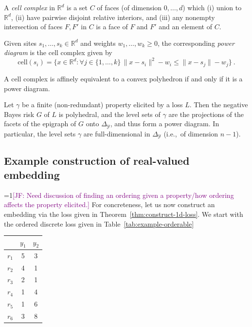 \documentclass[final]{colt2020} %
\newcommand{\Comments}{1}
\newcommand{\mynote}[2]{\ifnum\Comments=1\textcolor{#1}{#2}\fi}
\newcommand{\jessie}[1]{\mynote{purple}{[JF: #1]}}
\newcommand{\reals}{\mathbb{R}}
\newcommand{\cell}{\mathrm{cell}}
\newcommand{\simplex}{\Delta_\Y}
\newcommand{\Y}{\mathcal{Y}}
\begin{document}
\begin{definition}\label{def:cell-complex}
  A \emph{cell complex} in $\reals^d$ is a set $C$ of faces (of dimension $0,\ldots,d$) which (i) union to $\reals^d$, (ii) have pairwise disjoint relative interiors, and (iii) any nonempty intersection of faces $F,F'$ in $C$ is a face of $F$ and $F'$ and an element of $C$.
\end{definition}

\begin{definition}\label{def:power-diagram}
  Given sites $s_1,\ldots,s_k\in\reals^d$ and weights $w_1,\ldots,w_k \geq 0$, the corresponding \emph{power diagram} is the cell complex given by
  \begin{equation}
    \label{eq:pd}
    \cell(s_i) = \{ x \in\reals^d : \forall j \in \{1,\ldots,k\} \, \|x - s_i\|^2 - w_i \leq \|x - s_j\| - w_j\}~.
  \end{equation}
\end{definition}

\begin{theorem}\label{thm:aurenhammer}
  A cell complex is affinely equivalent to a convex polyhedron if and only if it is a power diagram.
\end{theorem}

\begin{lemma}\label{lem:finite-full-dim}
  Let $\gamma$ be a finite (non-redundant) property elicited by a loss $L$.
  Then the negative Bayes risk $G$ of $L$ is polyhedral, and the level sets of $\gamma$ are the projections of the facets of the epigraph of $G$ onto $\simplex$, and thus form a power diagram.
  In particular, the level sets $\gamma$ are full-dimensional in $\simplex$ (i.e.,\ of dimension $n-1$).
\end{lemma}


\subsection{Example construction of real-valued embedding}
\jessie{Need discussion of finding an ordering given a property/how ordering affects the property elicited.}
For concreteness, let us now construct an embedding via the loss given in Theorem~\ref{thm:construct-1d-loss}.
We start with the ordered discrete loss given in Table~\ref{tab:example-orderable}

\begin{center}
\begin{tabular}{c|cc|}	\label{tab:example-orderable}
	& $y_1$& $y_2$ \\ \hline
	$r_1$ & 5 & 3 \\
	$r_2$ & 4 & 1 \\
	$r_3$ & 2 & 1 \\
	$r_4$ & 1 & 4 \\
	$r_5$ & 1 & 6 \\
	$r_6$ & 3 & 8 \\
\end{tabular}
\end{center}
\end{document}
